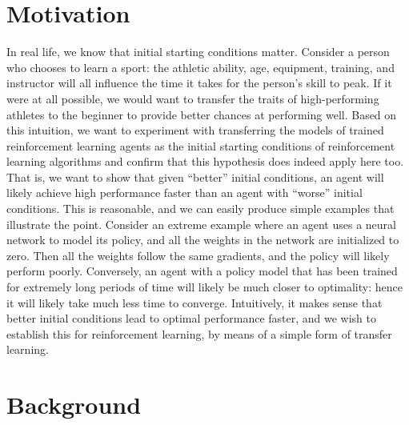 \documentclass[twocolumn]{article}
\begin{document}
	\section*{Motivation}
	In real life, we know that initial starting conditions matter. Consider a 
	person who chooses to learn a sport: the athletic ability, age, equipment, 
	training, and instructor will all influence the time it takes for the 
	person's skill to peak. If it were at all possible, we would want to 
	transfer the traits of high-performing athletes to the beginner to provide 
	better chances at performing well. Based on this intuition, we 
	want to experiment with transferring the models of trained reinforcement 
	learning agents as the initial starting conditions of reinforcement 
	learning algorithms and confirm that this hypothesis does indeed apply here 
	too. That is, we want to show that given ``better'' initial conditions, an 
	agent will likely achieve high performance faster than an agent with 
	``worse'' initial conditions. This is reasonable, and we can easily produce 
	simple examples that illustrate the point. Consider an extreme example 
	where an agent uses a neural network to model its policy, and all the 
	weights in the network are initialized to zero. Then all the weights follow 
	the same gradients, and the policy will likely perform poorly. Conversely, 
	an agent with a policy model that has been trained for extremely long 
	periods of time will likely be much closer to optimality: hence it will 
	likely take much less time to converge. Intuitively, it makes sense that 
	better initial conditions lead to optimal performance faster, and we wish 
	to establish this for reinforcement learning, by means of a simple form of 
	transfer learning. \\
	
	
	\section*{Background}
\end{document}
